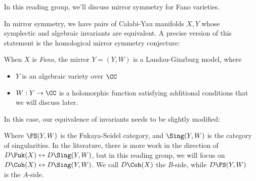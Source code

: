 

In this reading group, we'll discuss mirror symmetry for Fano varieties. 

In mirror symmetry, we have pairs of Calabi-Yau manifolds $X, Y$ whose symplectic and algebraic invariants are equivalent. A precise version of this statement is the homological mirror symmetry conjecture:


When $X$ is \emph{Fano}, the mirror $Y = (Y, W)$ is a Landau-Ginzburg model, where 
\begin{itemize}
    \item $Y$ is an algebraic variety over $\CC$ 
    \item $W: Y \to \CC$ is a holomorphic function satisfying additional conditions that we will discuss later.
\end{itemize}
In this case, our equivalence of invariants needs to be slightly modified:


Where $\FS(Y, W)$ is the Fukaya-Seidel category, and $\Sing(Y, W)$ is the category of singularities. 
In the literature, there is more work in the direction of $D\Fuk(X) \leftrightarrow D\Sing(Y, W)$, but in this reading group, we will focus on $D\Coh(X)\leftrightarrow D\Sing(Y, W)$. 
We call $D\Coh(X)$ the \emph{B}-side, while $D\FS(Y, W)$ is the \emph{A}-side. 




